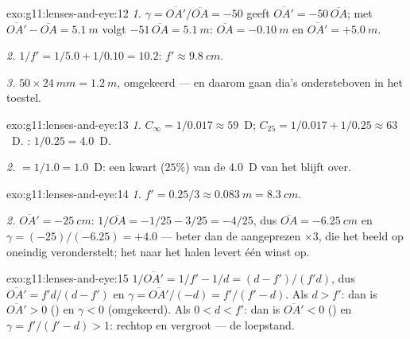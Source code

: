 \begin{solution}{exo:g11:lenses-and-eye:12}
\emph{1.} $\gamma = \overline{OA'}/\overline{OA} = -50$ geeft
$\overline{OA'} = -50\,\overline{OA}$; met
$\overline{OA'} - \overline{OA} = \qty{5.1}{m}$ volgt
$-51\,\overline{OA} = \qty{5.1}{m}$: $\overline{OA} = \qty{-0.10}{m}$ en
$\overline{OA'} = +\qty{5.0}{m}$.

\emph{2.} $1/f' = 1/5.0 + 1/0.10 = 10.2$: $f' \approx \qty{9.8}{cm}$.

\emph{3.} $50 \times \qty{24}{mm} = \qty{1.2}{m}$, omgekeerd --- en
daarom gaan dia's ondersteboven in het toestel.
\end{solution}

\begin{solution}{exo:g11:lenses-and-eye:13}
\emph{1.} $C_\infty = 1/0.017 \approx 59$~D;
$C_{25} = 1/0.017 + 1/0.25 \approx 63$~D. :
$1/0.25 = 4.0$~D.

\emph{2.}  $= 1/1.0 = 1.0$~D: een kwart ($25\%$) van de
$4.0$~D van het  blijft over.
\end{solution}

\begin{solution}{exo:g11:lenses-and-eye:14}
\emph{1.} $f' = 0.25/3 \approx \qty{0.083}{m} = \qty{8.3}{cm}$.

\emph{2.} $\overline{OA'} = \qty{-25}{cm}$:
$1/\overline{OA} = -1/25 - 3/25 = -4/25$, dus
$\overline{OA} = \qty{-6.25}{cm}$ en $\gamma = (-25)/(-6.25) = +4.0$ ---
beter dan de aangeprezen $\times 3$, die het beeld op oneindig
veronderstelt; het naar het  halen levert één  winst op.
\end{solution}

\begin{solution}{exo:g11:lenses-and-eye:15}
$1/\overline{OA'} = 1/f' - 1/d = (d - f')/(f'd)$, dus
$\overline{OA'} = f'd/(d - f')$ en
$\gamma = \overline{OA'}/(-d) = f'/(f' - d)$. Als $d > f'$: dan is
$\overline{OA'} > 0$ () en $\gamma < 0$ (omgekeerd). Als
$0 < d < f'$: dan is $\overline{OA'} < 0$ () en
$\gamma = f'/(f' - d) > 1$: rechtop en vergroot --- de loepstand.
\end{solution}

